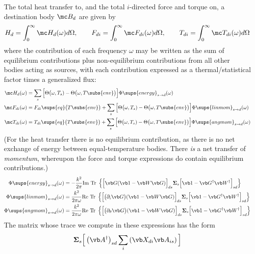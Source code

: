 \documentclass[letterpaper]{article}
\newcommand{\vbSigma}{\boldsymbol{\Sigma}}
\begin{document}
The total heat transfer to, and the total $i$-directed 
force and torque on, a destination body $\mc B_d$ are given by
\begin{align*}
 H_d    = \int_0^\infty \mc H_d(\omega) d\Omega,         \qquad 
 F_{di} = \int_0^\infty \mc F_{di}(\omega) d\Omega, \qquad 
 T_{di} = \int_0^\infty \mc T_{di}(\omega) d\Omega
\end{align*}
where the contribution of each frequency $\omega$ may be written
as the sum of equilibrium contributions plus non-equilibrium
contributions from all other bodies acting as sources, with 
each contribution expressed as a thermal/statistical factor 
times a generalized flux: 
\begin{align*}
 \mc H_d(\omega)
 &= \sum_{s} 
    \Big[ \Theta\big(\omega,T_s) - \Theta\big(\omega, T\subs{env}\big) \Big]
    \Phi\sups{energy}_{s\to d}(\omega)
\\
 \mc F_{di}(\omega)
 &= F_{di}\sups{eq}\big( T\subs{env} \big)
   +\sum_{s} 
    \Big[ \Theta\big(\omega,T_s) - \Theta\big(\omega, T\subs{env}\big) \Big]
    \Phi\sups{lin mom}_{s\to d}(\omega)
\\
 \mc T_{di}(\omega)
 &= T_{di}\sups{eq}\big( T\subs{env} \big)
   +\sum_{s} 
    \Big[ \Theta\big(\omega,T_s) - \Theta\big(\omega, T\subs{env}\big) \Big]
    \Phi\sups{ang mom}_{s\to d}(\omega)
\end{align*}
(For the heat transfer there is no equilibrium contribution, as there
is no net exchange of energy between equal-temperature bodies. There
\textit{is} a net transfer of \textit{momentum}, whereupon the force and
torque expressions do contain equilibrium contributions.)
\begin{align*}
 \Phi\sups{energy}_{s\to d}(\omega)
&=-\frac{k^2}{2\pi}\text{Im Tr }
   \left\{ 
           \Big[ \vb G (\vb 1 - \vb W \vb G)\Big]_{ds}
           \vbSigma_s
           \Big[\vb 1 - \vb G^\dagger \vb W^\dagger\Big]_{sd}
   \right\}
\\
 \Phi\sups{lin mom}_{s\to d}(\omega)
&= \frac{k^2}{2\pi \omega}\text{Re Tr }
   \left\{ 
           \Big[ \big(\partial_i \vb G\big) (\vb 1 - \vb W \vb G)\Big]_{ds}
           \vbSigma_s
           \Big[\vb 1 - \vb G^\dagger \vb W^\dagger\Big]_{sd}
   \right\}
\\
 \Phi\sups{ang mom}_{s\to d}(\omega)
&= \frac{k^2}{2\pi \omega}\text{Re Tr }
   \left\{ 
           \Big[ \big(\partial_\theta \vb G\big) (\vb 1 - \vb W \vb G)\Big]_{ds}
           \vbSigma_s
           \Big[\vb 1 - \vb G^\dagger \vb W^\dagger\Big]_{sd}
   \right\}
\end{align*}
The matrix whose trace we compute in these expressions has the form
\begin{align*}
 \vbSigma_s 
 \Big[ \left(\vb A^\dagger\right)_{sd}
       \sum_i \left(\vb X_{di} \vb A_{is}\right) 
 \Big]
\end{align*}
\end{document}
